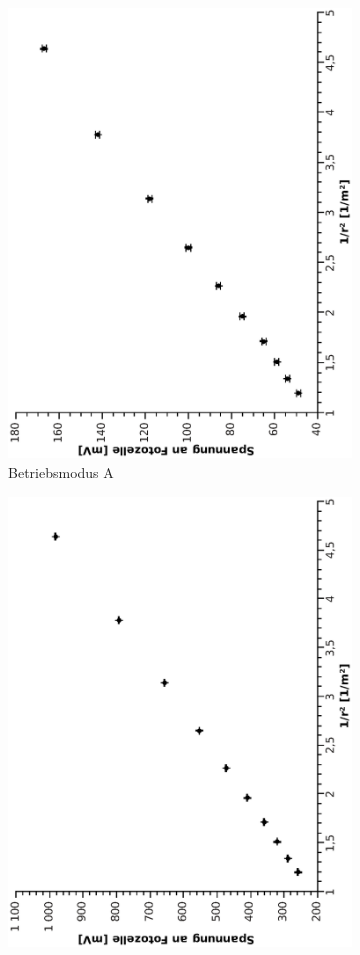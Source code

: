 \documentclass[12pt]{article}
\begin{document}


\begin{figure}
\centering
\begin{subfigure}{0.48\linewidth}
\includegraphics[width=0.75\linewidth, angle=-90]{niedrigetemp.eps}
\caption{ \label{figLowTemp} Betriebsmodus A}
\end{subfigure}
\begin{subfigure}{0.48\linewidth}
\includegraphics[width=0.75\linewidth, angle=-90]{hohetemp.eps}

\end{subfigure}
\end{figure}
\end{document}
